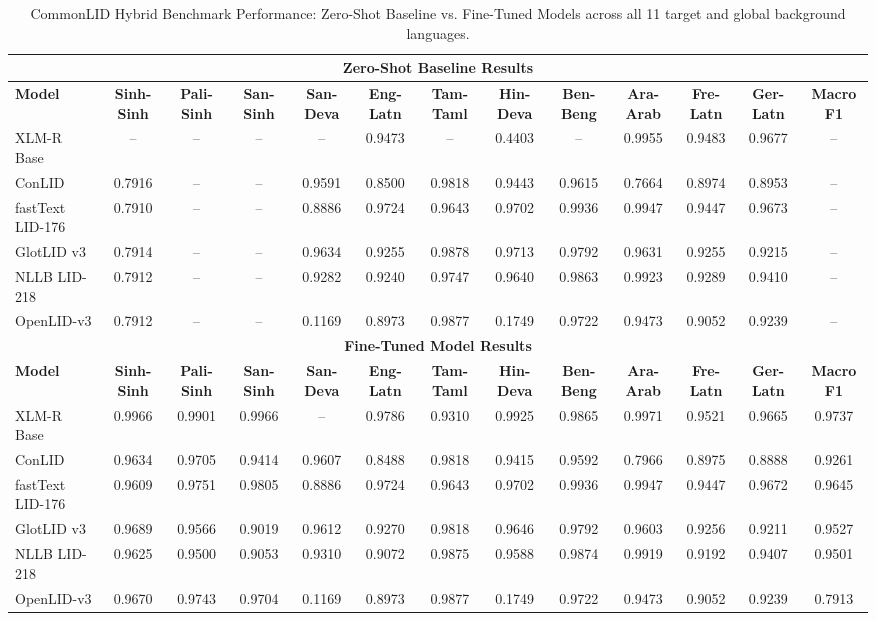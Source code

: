 \documentclass[11pt]{article}
\begin{document}
\begin{table}[p]
\caption{CommonLID Hybrid Benchmark Performance: Zero-Shot Baseline vs. Fine-Tuned Models across all 11 target and global background languages.}
\label{tab:common_full}
\begin{tabular}{l ccc cccccccc c}
\toprule
\multicolumn{13}{c}{\textbf{Zero-Shot Baseline Results}} \\
\midrule
\textbf{Model} & \textbf{Sinh-Sinh} & \textbf{Pali-Sinh} & \textbf{San-Sinh} & \textbf{San-Deva} & \textbf{Eng-Latn} & \textbf{Tam-Taml} & \textbf{Hin-Deva} & \textbf{Ben-Beng} & \textbf{Ara-Arab} & \textbf{Fre-Latn} & \textbf{Ger-Latn} & \textbf{Macro F1} \\
\midrule
XLM-R Base & -- & -- & -- & -- & 0.9473 & -- & 0.4403 & -- & 0.9955 & 0.9483 & 0.9677 & -- \\
ConLID & 0.7916 & -- & -- & 0.9591 & 0.8500 & 0.9818 & 0.9443 & 0.9615 & 0.7664 & 0.8974 & 0.8953 & -- \\
fastText LID-176 & 0.7910 & -- & -- & 0.8886 & 0.9724 & 0.9643 & 0.9702 & 0.9936 & 0.9947 & 0.9447 & 0.9673 & -- \\
GlotLID v3 & 0.7914 & -- & -- & 0.9634 & 0.9255 & 0.9878 & 0.9713 & 0.9792 & 0.9631 & 0.9255 & 0.9215 & -- \\
NLLB LID-218 & 0.7912 & -- & -- & 0.9282 & 0.9240 & 0.9747 & 0.9640 & 0.9863 & 0.9923 & 0.9289 & 0.9410 & -- \\
OpenLID-v3 & 0.7912 & -- & -- & 0.1169 & 0.8973 & 0.9877 & 0.1749 & 0.9722 & 0.9473 & 0.9052 & 0.9239 & -- \\
\midrule
\multicolumn{13}{c}{\textbf{Fine-Tuned Model Results}} \\
\midrule
\textbf{Model} & \textbf{Sinh-Sinh} & \textbf{Pali-Sinh} & \textbf{San-Sinh} & \textbf{San-Deva} & \textbf{Eng-Latn} & \textbf{Tam-Taml} & \textbf{Hin-Deva} & \textbf{Ben-Beng} & \textbf{Ara-Arab} & \textbf{Fre-Latn} & \textbf{Ger-Latn} & \textbf{Macro F1} \\
\midrule
XLM-R Base & 0.9966 & 0.9901 & 0.9966 & -- & 0.9786 & 0.9310 & 0.9925 & 0.9865 & 0.9971 & 0.9521 & 0.9665 & 0.9737 \\
ConLID & 0.9634 & 0.9705 & 0.9414 & 0.9607 & 0.8488 & 0.9818 & 0.9415 & 0.9592 & 0.7966 & 0.8975 & 0.8888 & 0.9261 \\
fastText LID-176 & 0.9609 & 0.9751 & 0.9805 & 0.8886 & 0.9724 & 0.9643 & 0.9702 & 0.9936 & 0.9947 & 0.9447 & 0.9672 & 0.9645 \\
GlotLID v3 & 0.9689 & 0.9566 & 0.9019 & 0.9612 & 0.9270 & 0.9818 & 0.9646 & 0.9792 & 0.9603 & 0.9256 & 0.9211 & 0.9527 \\
NLLB LID-218 & 0.9625 & 0.9500 & 0.9053 & 0.9310 & 0.9072 & 0.9875 & 0.9588 & 0.9874 & 0.9919 & 0.9192 & 0.9407 & 0.9501 \\
OpenLID-v3 & 0.9670 & 0.9743 & 0.9704 & 0.1169 & 0.8973 & 0.9877 & 0.1749 & 0.9722 & 0.9473 & 0.9052 & 0.9239 & 0.7913 \\
\bottomrule
\end{tabular}


\end{table}
\end{document}
